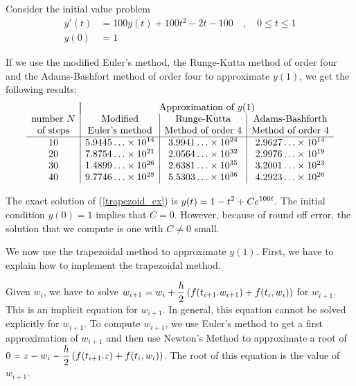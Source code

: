\begin{egg}
Consider the initial value problem
\begin{equation}\label{trapezoid_ex}
\begin{split}
y'(t) &= 100 y(t) + 100 t^2  -2t -100 \quad , \quad 0\leq t \leq 1 \\
y(0) &= 1
\end{split}
\end{equation}

If we use the modified Euler's method, the Runge-Kutta method of
order four and the Adams-Bashfort method of order four to approximate
$y(1)$, we get the following results:
\[
\begin{array}{c|c|c|c}
 & \multicolumn{3}{|c}{\text{Approximation of $y(1)$}} \\
\text{number $N$} & \text{Modified} & \text{Runge-Kutta} &
\text{Adams-Bashforth} \\
\text{of steps} & \text{Euler's method} & \text{Method of order $4$} &
\text{Method of order $4$}\\
\hline
10 & 5.9445\ldots \times 10^{14} & 3.9941\ldots \times 10^{24} &
2.9627\ldots \times 10^{14} \\
20 & 7.8754\ldots \times 10^{21} & 2.0564\ldots \times 10^{32} &
2.9976\ldots \times 10^{19} \\
30 & 1.4899\ldots \times 10^{26} & 2.6381\ldots \times 10^{35} &
3.2001\ldots \times 10^{23} \\
40 & 9.7746\ldots \times 10^{28} & 5.5303\ldots \times 10^{36} &
4.2923\ldots \times 10^{26}
\end{array}
\]

The exact solution of (\ref{trapezoid_ex}) is
$\displaystyle y(t) = 1-t^2+C e^{100t}$.  The initial condition $y(0)=1$ implies
that $C=0$.  However, because of round off error, the solution that we
compute is one with $C\not=0$ small.

We now use the trapezoidal method to approximate $y(1)$.  First, we
have to explain how to implement the trapezoidal method.

Given $w_i$, we have to solve
$\displaystyle w_{i+1} =
w_i + \frac{h}{2} \left( f(t_{i+1}.w_{i+1}) + f(t_i,w_i) \right)$
for $w_{i+1}$.  This is an implicit equation for $w_{i+1}$.  In
general, this equation cannot be solved explicitly for $w_{i+1}$.
To compute $w_{i+1}$, we use Euler's method to get a first approximation
of $w_{i+1}$ and then use Newton's Method to approximate a root
of
$\displaystyle
 0 = z - w_i - \frac{h}{2} \left( f(t_{i+1}.z) + f(t_i,w_i) \right)$.
The root of this equation is the value of $w_{i+1}$.


\end{egg}
